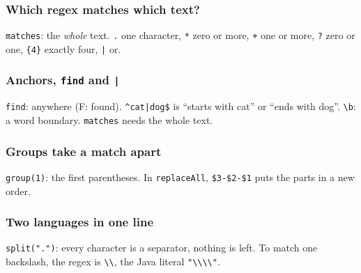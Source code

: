 \documentclass[aspectratio=169,10pt,compress]{beamer}
\begin{document}
\begin{frame}[t,fragile] \frametitle{Which regex matches which text?}

  \vspace{0.2em}
  \small \texttt{matches}: the \emph{whole} text. \texttt{.} one character, \texttt{*} zero or more, \texttt{+} one or more, \texttt{?} zero or one, \texttt{\{4\}} exactly four, \texttt{|} or.
\end{frame}




\begin{frame}[t,fragile] \frametitle{Anchors, \texttt{find} and \texttt{|}}

  \vspace{0.2em}
  \small \texttt{find}: anywhere (F: found). \texttt{\textasciicircum cat|dog\$} is ``starts with cat'' or ``ends with dog''. \texttt{\textbackslash b}: a word boundary. \texttt{matches} needs the whole text.
\end{frame}




\begin{frame}[t,fragile] \frametitle{Groups take a match apart}

  \vspace{0.2em}
  \small \texttt{group(1)}: the first parentheses. In \texttt{replaceAll}, \texttt{\$3-\$2-\$1} puts the parts in a new order.
\end{frame}





\begin{frame}[t,fragile] \frametitle{Two languages in one line}

  \vspace{0.2em}
  \small \texttt{split(".")}: every character is a separator, nothing is left. To match one backslash, the regex is \texttt{\textbackslash\textbackslash}, the Java literal \texttt{"\textbackslash\textbackslash\textbackslash\textbackslash"}.
\end{frame}
\end{document}
